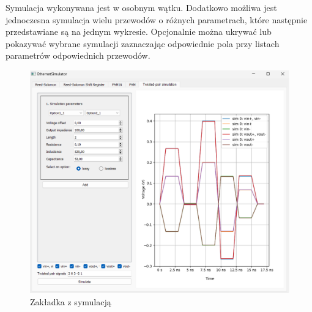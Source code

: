 Symulacja wykonywana jest w osobnym wątku. Dodatkowo możliwa jest jednoczesna symulacja wielu przewodów o różnych parametrach, które następnie przedstawiane są na jednym wykresie. Opcjonalnie można ukrywać lub pokazywać wybrane symulacji zaznaczając odpowiednie pola przy listach parametrów odpowiednich przewodów.

\begin{figure}[ht]
    \centering
    \includegraphics[width=\textwidth]{images/sim.png}
    \caption{Zakładka z symulacją}
    \label{fig:sim_png}
\end{figure}